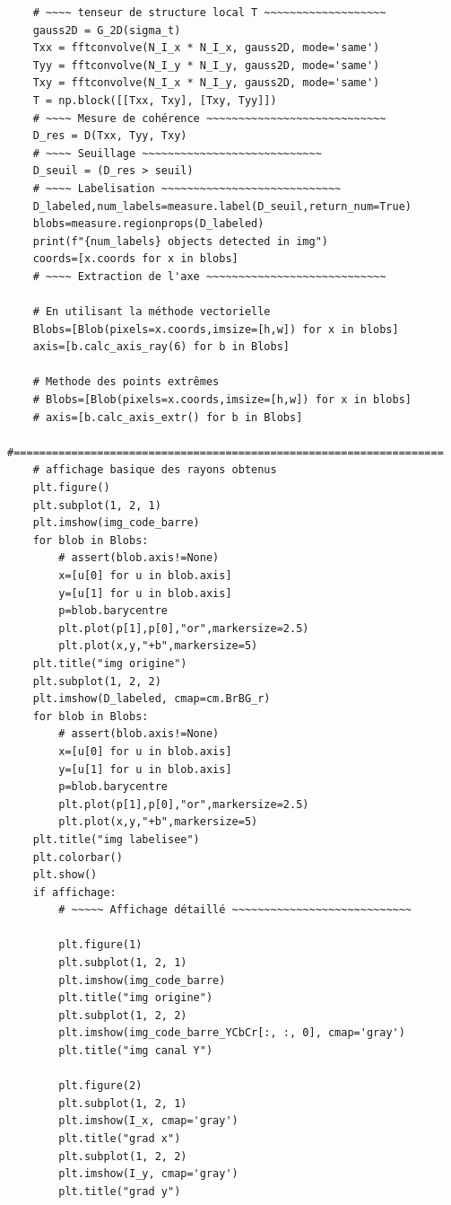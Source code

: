 \documentclass{rapport}
\begin{document}
\begin{lstlisting}
    # ~~~~ tenseur de structure local T ~~~~~~~~~~~~~~~~~~~
    gauss2D = G_2D(sigma_t)
    Txx = fftconvolve(N_I_x * N_I_x, gauss2D, mode='same')
    Tyy = fftconvolve(N_I_y * N_I_y, gauss2D, mode='same')
    Txy = fftconvolve(N_I_x * N_I_y, gauss2D, mode='same')
    T = np.block([[Txx, Txy], [Txy, Tyy]])
    # ~~~~ Mesure de cohérence ~~~~~~~~~~~~~~~~~~~~~~~~~~~~
    D_res = D(Txx, Tyy, Txy)
    # ~~~~ Seuillage ~~~~~~~~~~~~~~~~~~~~~~~~~~~~
    D_seuil = (D_res > seuil)
    # ~~~~ Labelisation ~~~~~~~~~~~~~~~~~~~~~~~~~~~~
    D_labeled,num_labels=measure.label(D_seuil,return_num=True)
    blobs=measure.regionprops(D_labeled)
    print(f"{num_labels} objects detected in img")
    coords=[x.coords for x in blobs]
    # ~~~~ Extraction de l'axe ~~~~~~~~~~~~~~~~~~~~~~~~~~~~
    
    # En utilisant la méthode vectorielle
    Blobs=[Blob(pixels=x.coords,imsize=[h,w]) for x in blobs]
    axis=[b.calc_axis_ray(6) for b in Blobs]
    
    # Methode des points extrêmes
    # Blobs=[Blob(pixels=x.coords,imsize=[h,w]) for x in blobs]
    # axis=[b.calc_axis_extr() for b in Blobs]
    #===================================================================
    # affichage basique des rayons obtenus
    plt.figure()
    plt.subplot(1, 2, 1)
    plt.imshow(img_code_barre)
    for blob in Blobs:
        # assert(blob.axis!=None)
        x=[u[0] for u in blob.axis]
        y=[u[1] for u in blob.axis]
        p=blob.barycentre
        plt.plot(p[1],p[0],"or",markersize=2.5)
        plt.plot(x,y,"+b",markersize=5)
    plt.title("img origine")
    plt.subplot(1, 2, 2)
    plt.imshow(D_labeled, cmap=cm.BrBG_r)
    for blob in Blobs:
        # assert(blob.axis!=None)
        x=[u[0] for u in blob.axis]
        y=[u[1] for u in blob.axis]
        p=blob.barycentre
        plt.plot(p[1],p[0],"or",markersize=2.5)
        plt.plot(x,y,"+b",markersize=5)
    plt.title("img labelisee")
    plt.colorbar()
    plt.show()
    if affichage:
        # ~~~~~ Affichage détaillé ~~~~~~~~~~~~~~~~~~~~~~~~~~~~

        plt.figure(1)
        plt.subplot(1, 2, 1)
        plt.imshow(img_code_barre)
        plt.title("img origine")
        plt.subplot(1, 2, 2)
        plt.imshow(img_code_barre_YCbCr[:, :, 0], cmap='gray')
        plt.title("img canal Y")

        plt.figure(2)
        plt.subplot(1, 2, 1)
        plt.imshow(I_x, cmap='gray')
        plt.title("grad x")
        plt.subplot(1, 2, 2)
        plt.imshow(I_y, cmap='gray')
        plt.title("grad y")


\end{lstlisting}
\end{document}
